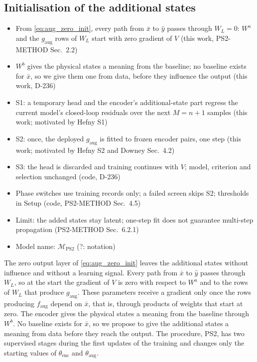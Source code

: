 \subsection{Initialisation of the additional states}\label{sec:aug_ps2}
\ifdraft
\begin{itemize}
\item From \eqref{eq:aug_zero_init}, every path from $\bar x$ to $\hat y$ passes through $W_L=0$: $W^a$ and the $g_{\mathrm{aug}}$ rows of $W_L$ start with zero gradient of $V$ (this work, PS2-METHOD Sec.~2.2)
\item $W^b$ gives the physical states a meaning from the baseline; no baseline exists for $\bar x$, so we give them one from data, before they influence the output (this work, D-236)
\item S1: a temporary head and the encoder's additional-state part regress the current model's closed-loop residuals over the next $M=n+1$ samples (this work; motivated by Hefny S1)
\item S2: once, the deployed $g_{\mathrm{aug}}$ is fitted to frozen encoder pairs, one step (this work; motivated by Hefny S2 and Downey Sec.~4.2)
\item S3: the head is discarded and training continues with $V$; model, criterion and selection unchanged (code, D-236)
\item Phase switches use training records only; a failed screen skips S2; thresholds in Setup (code, PS2-METHOD Sec.~4.5)
\item Limit: the added states stay latent; one-step fit does not guarantee multi-step propagation (PS2-METHOD Sec.~6.2.1)
\item Model name: $\mathcal M_{\mathrm{PS2}}$ (?: notation)
\end{itemize}
\fi

The zero output layer of \eqref{eq:aug_zero_init} leaves the additional states
without influence and without a learning signal.
Every path from $\bar x$ to $\hat y$ passes through $W_L$, so at the start
the gradient of $V$ is zero with respect to $W^a$ and to the rows of $W_L$
that produce $g_{\mathrm{aug}}$.
These parameters receive a gradient only once the rows producing
$f_{\mathrm{aug}}$ depend on $\bar x$, that is, through products of weights
that start at zero.
The encoder gives the physical states a meaning from the baseline through
$W^b$.
No baseline exists for $\bar x$, so we propose to give the additional states a
meaning from data before they reach the output.
The procedure, PS2, has two supervised stages during the first updates of the
training and changes only the starting values of $\theta_{\mathrm{enc}}$ and
$\theta_{\mathrm{aug}}$.

